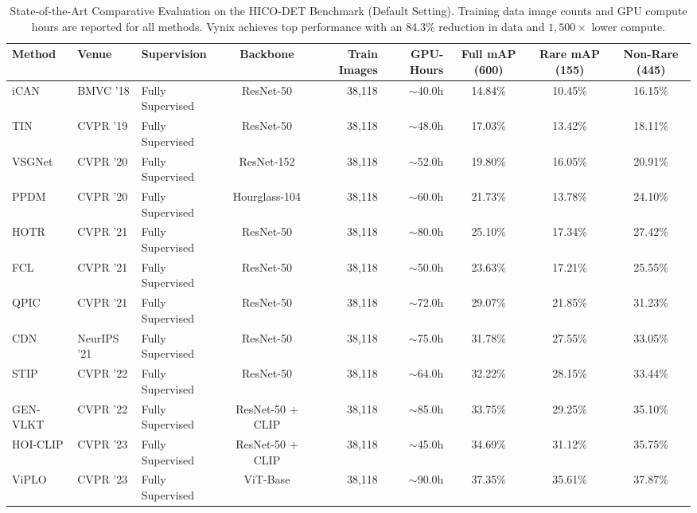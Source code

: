 \documentclass[conference]{IEEEtran}
\begin{document}
\begin{table}[t]
\centering
\small
\caption{State-of-the-Art Comparative Evaluation on the HICO-DET Benchmark (Default Setting). Training data image counts and GPU compute hours are reported for all methods. Vynix achieves top performance with an 84.3\% reduction in data and $1,500\times$ lower compute.}
\label{tab:hico_det_literature_benchmark}
\begin{tabular}{l l l c r r c c c}
\toprule
\textbf{Method} & \textbf{Venue} & \textbf{Supervision} & \textbf{Backbone} & \textbf{Train Images} & \textbf{GPU-Hours} & \textbf{Full mAP (600)} & \textbf{Rare mAP (155)} & \textbf{Non-Rare (445)} \\
\midrule
iCAN \cite{gao2018ican} & BMVC '18 & Fully Supervised & ResNet-50 & 38,118 & $\sim$40.0h & 14.84\% & 10.45\% & 16.15\% \\
TIN \cite{li2019tin} & CVPR '19 & Fully Supervised & ResNet-50 & 38,118 & $\sim$48.0h & 17.03\% & 13.42\% & 18.11\% \\
VSGNet \cite{ulutan2020vsgnet} & CVPR '20 & Fully Supervised & ResNet-152 & 38,118 & $\sim$52.0h & 19.80\% & 16.05\% & 20.91\% \\
PPDM \cite{liao2020ppdm} & CVPR '20 & Fully Supervised & Hourglass-104 & 38,118 & $\sim$60.0h & 21.73\% & 13.78\% & 24.10\% \\
HOTR \cite{kim2021hotr} & CVPR '21 & Fully Supervised & ResNet-50 & 38,118 & $\sim$80.0h & 25.10\% & 17.34\% & 27.42\% \\
FCL \cite{hou2021fcl} & CVPR '21 & Fully Supervised & ResNet-50 & 38,118 & $\sim$50.0h & 23.63\% & 17.21\% & 25.55\% \\
QPIC \cite{tamura2021qpic} & CVPR '21 & Fully Supervised & ResNet-50 & 38,118 & $\sim$72.0h & 29.07\% & 21.85\% & 31.23\% \\
CDN \cite{zhang2021cdn} & NeurIPS '21 & Fully Supervised & ResNet-50 & 38,118 & $\sim$75.0h & 31.78\% & 27.55\% & 33.05\% \\
STIP \cite{zhang2022stip} & CVPR '22 & Fully Supervised & ResNet-50 & 38,118 & $\sim$64.0h & 32.22\% & 28.15\% & 33.44\% \\
GEN-VLKT \cite{liao2022genvlkt} & CVPR '22 & Fully Supervised & ResNet-50 + CLIP & 38,118 & $\sim$85.0h & 33.75\% & 29.25\% & 35.10\% \\
HOI-CLIP \cite{ning2023hoiclip} & CVPR '23 & Fully Supervised & ResNet-50 + CLIP & 38,118 & $\sim$45.0h & 34.69\% & 31.12\% & 35.75\% \\
ViPLO \cite{park2023viplo} & CVPR '23 & Fully Supervised & ViT-Base & 38,118 & $\sim$90.0h & 37.35\% & 35.61\% & 37.87\% \\

\end{tabular}
\end{table}
\end{document}
